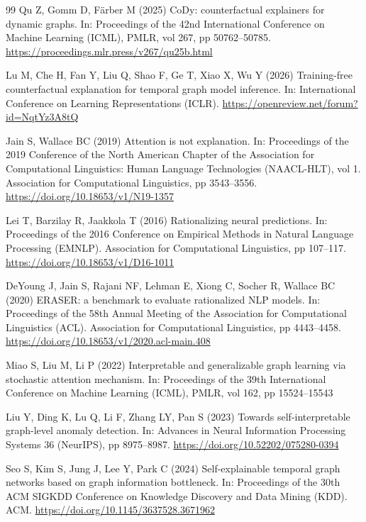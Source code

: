 \documentclass[pdflatex,sn-basic]{sn-jnl}
\theoremstyle{definition}
\theoremstyle{plain}
\begin{document}
\begin{thebibliography}{99}
Qu Z, Gomm D, F\"arber M (2025) CoDy: counterfactual explainers for dynamic graphs. In: Proceedings of the 42nd International Conference on Machine Learning (ICML), PMLR, vol 267, pp 50762--50785. \url{https://proceedings.mlr.press/v267/qu25b.html}

Lu M, Che H, Fan Y, Liu Q, Shao F, Ge T, Xiao X, Wu Y (2026) Training-free counterfactual explanation for temporal graph model inference. In: International Conference on Learning Representations (ICLR). \url{https://openreview.net/forum?id=NqtYz3A8tQ}

Jain S, Wallace BC (2019) Attention is not explanation. In: Proceedings of the 2019 Conference of the North American Chapter of the Association for Computational Linguistics: Human Language Technologies (NAACL-HLT), vol 1. Association for Computational Linguistics, pp 3543--3556. \url{https://doi.org/10.18653/v1/N19-1357}

Lei T, Barzilay R, Jaakkola T (2016) Rationalizing neural predictions. In: Proceedings of the 2016 Conference on Empirical Methods in Natural Language Processing (EMNLP). Association for Computational Linguistics, pp 107--117. \url{https://doi.org/10.18653/v1/D16-1011}

DeYoung J, Jain S, Rajani NF, Lehman E, Xiong C, Socher R, Wallace BC (2020) ERASER: a benchmark to evaluate rationalized NLP models. In: Proceedings of the 58th Annual Meeting of the Association for Computational Linguistics (ACL). Association for Computational Linguistics, pp 4443--4458. \url{https://doi.org/10.18653/v1/2020.acl-main.408}

Miao S, Liu M, Li P (2022) Interpretable and generalizable graph learning via stochastic attention mechanism. In: Proceedings of the 39th International Conference on Machine Learning (ICML), PMLR, vol 162, pp 15524--15543

Liu Y, Ding K, Lu Q, Li F, Zhang LY, Pan S (2023) Towards self-interpretable graph-level anomaly detection. In: Advances in Neural Information Processing Systems 36 (NeurIPS), pp 8975--8987. \url{https://doi.org/10.52202/075280-0394}

Seo S, Kim S, Jung J, Lee Y, Park C (2024) Self-explainable temporal graph networks based on graph information bottleneck. In: Proceedings of the 30th ACM SIGKDD Conference on Knowledge Discovery and Data Mining (KDD). ACM. \url{https://doi.org/10.1145/3637528.3671962}


\end{thebibliography}
\end{document}

